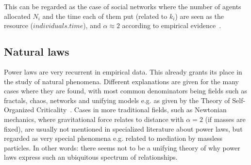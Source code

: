 \documentclass[10pt,letterpaper]{article}
\begin{document}
This can be regarded as the case of social networks where the number of agents allocated $N_i$ and the time each of them put (related to $k_i$) are seen as the resource ($individuals . time$), and $\alpha\approx 2$
according to empirical evidence~\cite{newman}.

% 

\subsection{Natural laws}

Power laws are very recurrent in empirical data.
This already grants its place in the study of natural phenomena.
Different explanations are given for the many cases where
they are found, with most common denominators being fields such as
fractals, chaos, networks and unifying models e.g. as given by the Theory of Self-Organized Criticality~\cite{part}.
Cases in more traditional fields, such as Newtonian mechanics, where gravitational force relates to distance with $\alpha=2$ (if masses are fixed), are usually not mentioned in specialized literature about power laws, but regarded as very special phenomena e.g. related to mediation by massless particles.
In other words: there seems not to be a unifying theory of why power laws express such
an ubiquitous spectrum of relationships.
\end{document}
